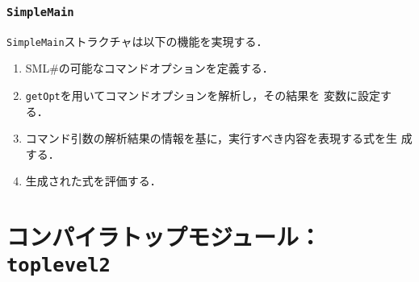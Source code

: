 \documentclass{jbook}
\newif\ifjp
\newcommand{\txt}[2]{#1}
\newcommand{\smlsharp}{SML\#}
\newcommand{\code}[1]{\mbox{\large\tt #1}}
\begin{document}
\subsection{\code{SimpleMain}}
	\code{SimpleMain}ストラクチャは以下の機能を実現する．
\begin{enumerate}
\item \smlsharp{}の可能なコマンドオプションを定義する．
\item \code{getOpt}を用いてコマンドオプションを解析し，その結果を
変数に設定する．
\item コマンド引数の解析結果の情報を基に，実行すべき内容を表現する式を生
成する．
\item 生成された式を評価する．
\end{enumerate}

\fi%


% 
\chapter{\txt
{コンパイラトップモジュール：\code{toplevel2}}
{The compiler top module : \code{toplevel2}}
}
\label{chap:Loadfile}

\ifjp%
\begin{enumerate}
\item ソースロケーションとファイル構成

ディレクトリ \code{src/compiler/toplevel2/main}下の以下のファイルからなる．
\begin{itemize}
\item \code{Top.sml} コンパイラトップレベルの処理を実現
\item \code{TopData.ppg} トップレベル処理のためのデータ構造の定義．
\item \code{NameEvalEnvUtils.sml} 対話型モード実現のため．名前評価モジュール環境の更新．
\end{itemize}

\item 機能概要 
\begin{enumerate}
\item ソースファイルのコンパイル
\item メイン関数コードの生成
\item 対話型環境の構築
\item 組込環境のセットアップ
\end{enumerate}
\item 他モジュールとのインターフェイス
\begin{itemize}
\item \code{src/compiler/main/main/SimpleMain.sml}から呼び出される．
\item \code{src/compiler/main/main/RunLoop.sml}から呼び出される．
\end{itemize}
\end{enumerate}
\else%
\fi%
\end{document}
